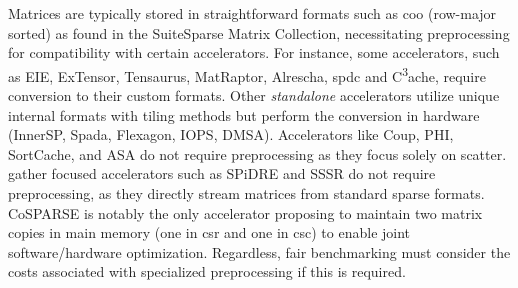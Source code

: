 Matrices are typically stored in straightforward formats such as \acrshort{coo} (row-major sorted) as found in the SuiteSparse Matrix Collection, necessitating preprocessing for compatibility with certain accelerators.
For instance, some accelerators, such as EIE, ExTensor, Tensaurus, MatRaptor, Alrescha, \acrlong{spdc} and C\textsuperscript{3}ache, require conversion to their custom formats.
Other \textit{standalone} accelerators utilize unique internal formats with \gls{tiling} methods but perform the conversion in hardware (\eg InnerSP, Spada, Flexagon, IOPS, DMSA).
Accelerators like Coup, PHI, SortCache, and ASA do not require preprocessing as they focus solely on \gls{scatter}.
\Gls{gather} focused accelerators such as SPiDRE and SSSR do not require preprocessing, as they directly stream matrices from standard sparse formats.
CoSPARSE is notably the only accelerator proposing to maintain two matrix copies in main memory (one in \acrshort{csr} and one in \acrshort{csc}) to enable joint software/hardware optimization.
Regardless, fair benchmarking must consider the costs associated with specialized preprocessing if this is required.

